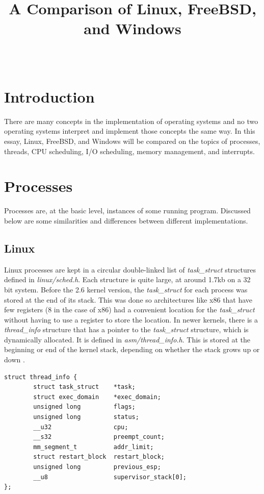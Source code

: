 \documentclass[10pt,draftclsnofoot,onecolumn,journal,compsoc]{IEEEtran}
\title{A Comparison of Linux, FreeBSD, and Windows}
\author{
  \IEEEauthorblockN{Heidi Clayton} \\
  \IEEEauthorblockA{CS 444: Operating Systems II Spring 2017 \\ Oregon State University}
}
\begin{document}
\maketitle
\newpage
\tableofcontents
\newpage

\section{Introduction}
There are many concepts in the implementation of operating systems and no two operating systems interpret and implement those concepts the same way. In this essay, Linux, FreeBSD, and Windows will be compared on the topics of processes, threads, CPU scheduling, I/O scheduling, memory management, and interrupts.

\section{Processes}
Processes are, at the basic level, instances of some running program. Discussed below are some similarities and differences between different implementations.

\subsection{Linux}
Linux processes are kept in a circular double-linked list of \textit{task\_struct} structures defined in \textit{linux/sched.h}. Each structure is quite large, at around 1.7kb on a 32 bit system. Before the 2.6 kernel version, the \textit{task\_struct} for each process was stored at the end of its stack. This was done so architectures like x86 that have few registers (8 in the case of x86) had a convenient location for the \textit{task\_struct} without having to use a register to store the location. In newer kernels, there is a \textit{thread\_info} structure that has a pointer to the \textit{task\_struct} structure, which is dynamically allocated. It is defined in \textit{asm/thread\_info.h}. This is stored at the beginning or end of the kernel stack, depending on whether the stack grows up or down \cite{linux_proc}.

\begin{lstlisting}[caption={\textit{thread\_info} structure}]
struct thread_info {
        struct task_struct    *task;
        struct exec_domain    *exec_domain;
        unsigned long         flags;
        unsigned long         status;
        __u32                 cpu;
        __s32                 preempt_count;
        mm_segment_t          addr_limit;
        struct restart_block  restart_block;
        unsigned long         previous_esp;
        __u8                  supervisor_stack[0];
};
\end{lstlisting}
\end{document}
